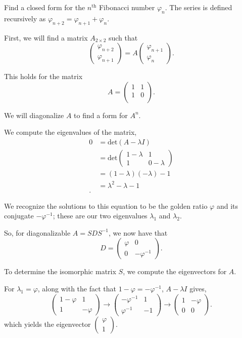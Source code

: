 \documentclass{article}
\begin{document}
\begin{problem}
  Find a closed form for the $n^{\text{th}}$ Fibonacci number $\varphi_n$. The series is defined recursively as $\varphi_{n+2}=\varphi_{n+1}+\varphi_{n}$. 
\end{problem}

First, we will find a matrix $A_{2\times 2}$ such that \[
  \begin{pmatrix} \varphi_{n+2} \\ \varphi_{n+1} \end{pmatrix} =
  A \begin{pmatrix} \varphi_{n+1} \\ \varphi_{n} \end{pmatrix} 
.\] 

This holds for the matrix \[
  A=\begin{pmatrix} 1 & 1 \\ 1 & 0 \\ \end{pmatrix} 
.\] 

We will diagonalize $A$ to find a form for $A^n$.

We compute the eigenvalues of the matrix,
 \begin{align*}
  0&= \text{det}(A-\lambda I) \\
   &= \text{det}\begin{pmatrix} 1-\lambda & 1 \\ 1 & 0-\lambda \end{pmatrix}  \\
   &= (1-\lambda)(-\lambda)-1 \\
   &= \lambda^2-\lambda-1 \\
.\end{align*}

We recognize the solutions to this equation to be the golden ratio $\varphi$ and its conjugate $-\varphi^{-1}$; these are our two eigenvalues $\lambda_1$ and $\lambda_2$. 

So, for diagonalizable $A=SDS^{-1}$, we now have that \[
  D=\begin{pmatrix} \varphi & 0 \\ 0 & -\varphi^{-1} \end{pmatrix} 
.\] 

To determine the isomorphic matrix $S$, we compute the eigenvectors for $A$.

For $\lambda_1=\varphi$, along with the fact that $1-\varphi=-\varphi^{-1}$, $A-\lambda I$ gives, 
\[
  \begin{pmatrix} 1-\varphi & 1 \\ 1 & -\varphi \end{pmatrix} 
  \rightarrow
  \begin{pmatrix} -\varphi^{-1} & 1 \\ \varphi^{-1} & -1 \end{pmatrix} 
  \rightarrow
  \begin{pmatrix} 1 & -\varphi \\ 0 & 0 \end{pmatrix} 
.\] 
which yields the eigenvector $\begin{pmatrix} \varphi \\ 1 \end{pmatrix}$.
\end{document}

